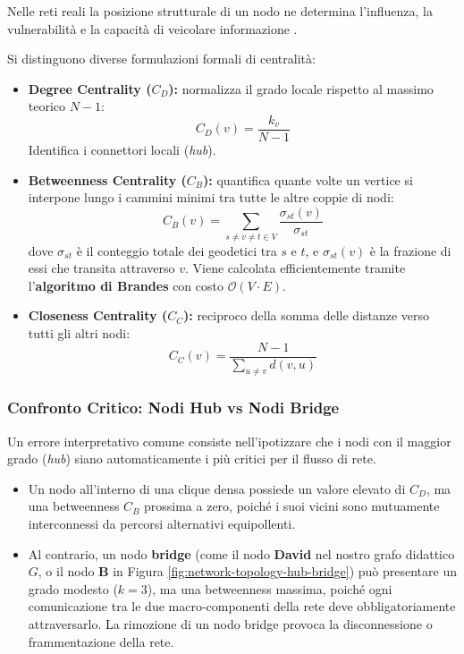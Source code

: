 Nelle reti reali la posizione strutturale di un nodo ne determina l'influenza, la vulnerabilità e la capacità di veicolare informazione \cite{barabasi2016}.

\begin{definition}
Si distinguono diverse formulazioni formali di centralità:
\begin{itemize}
    \item \textbf{Degree Centrality ($C_D$):} normalizza il grado locale rispetto al massimo teorico $N-1$:
    \begin{equation}
        C_D(v) = \frac{k_v}{N - 1}
    \end{equation}
    Identifica i connettori locali (\textit{hub}).
    \item \textbf{Betweenness Centrality ($C_B$):} quantifica quante volte un vertice si interpone lungo i cammini minimi tra tutte le altre coppie di nodi:
    \begin{equation}
        C_B(v) = \sum_{s \ne v \ne t \in V} \frac{\sigma_{st}(v)}{\sigma_{st}}
    \end{equation}
    dove $\sigma_{st}$ è il conteggio totale dei geodetici tra $s$ e $t$, e $\sigma_{st}(v)$ è la frazione di essi che transita attraverso $v$. Viene calcolata efficientemente tramite l'\textbf{algoritmo di Brandes} \cite{brandes2001} con costo $\mathcal{O}(V \cdot E)$.
    \item \textbf{Closeness Centrality ($C_C$):} reciproco della somma delle distanze verso tutti gli altri nodi:
    \begin{equation}
        C_C(v) = \frac{N - 1}{\sum_{u \ne v} d(v, u)}
    \end{equation}
\end{itemize}
\end{definition}

\subsubsection{Confronto Critico: Nodi Hub vs Nodi Bridge}
Un errore interpretativo comune consiste nell'ipotizzare che i nodi con il maggior grado (\textit{hub}) siano automaticamente i più critici per il flusso di rete. 
\begin{itemize}
    \item Un nodo all'interno di una clique densa possiede un valore elevato di $C_D$, ma una betweenness $C_B$ prossima a zero, poiché i suoi vicini sono mutuamente interconnessi da percorsi alternativi equipollenti.
    \item Al contrario, un nodo \textbf{bridge} (come il nodo \textbf{David} nel nostro grafo didattico $G$, o il nodo \textbf{B} in Figura \ref{fig:network-topology-hub-bridge}) può presentare un grado modesto ($k = 3$), ma una betweenness massima, poiché ogni comunicazione tra le due macro-componenti della rete deve obbligatoriamente attraversarlo. La rimozione di un nodo bridge provoca la disconnessione o frammentazione della rete.
\end{itemize}

